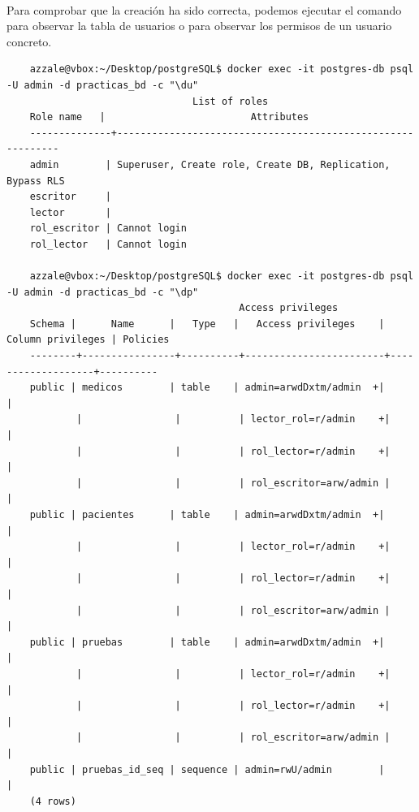 \documentclass{article}
\begin{document}
\\
Para comprobar que la creación ha sido correcta, podemos ejecutar el comando \textit{\du} para observar la tabla de usuarios o \textit{\dp} para observar los permisos de un usuario concreto.
\begin{tcolorbox}[colback=black, coltext=white, fontupper=\ttfamily, title=Terminal]
\begin{verbatim}
    azzale@vbox:~/Desktop/postgreSQL$ docker exec -it postgres-db psql -U admin -d practicas_bd -c "\du"
                                List of roles
    Role name   |                         Attributes                         
    --------------+------------------------------------------------------------
    admin        | Superuser, Create role, Create DB, Replication, Bypass RLS
    escritor     | 
    lector       | 
    rol_escritor | Cannot login
    rol_lector   | Cannot login

    azzale@vbox:~/Desktop/postgreSQL$ docker exec -it postgres-db psql -U admin -d practicas_bd -c "\dp"
                                        Access privileges
    Schema |      Name      |   Type   |   Access privileges    | Column privileges | Policies 
    --------+----------------+----------+------------------------+-------------------+----------
    public | medicos        | table    | admin=arwdDxtm/admin  +|                   | 
            |                |          | lector_rol=r/admin    +|                   | 
            |                |          | rol_lector=r/admin    +|                   | 
            |                |          | rol_escritor=arw/admin |                   | 
    public | pacientes      | table    | admin=arwdDxtm/admin  +|                   | 
            |                |          | lector_rol=r/admin    +|                   | 
            |                |          | rol_lector=r/admin    +|                   | 
            |                |          | rol_escritor=arw/admin |                   | 
    public | pruebas        | table    | admin=arwdDxtm/admin  +|                   | 
            |                |          | lector_rol=r/admin    +|                   | 
            |                |          | rol_lector=r/admin    +|                   | 
            |                |          | rol_escritor=arw/admin |                   | 
    public | pruebas_id_seq | sequence | admin=rwU/admin        |                   | 
    (4 rows)
\end{verbatim}
\end{tcolorbox}
\\
\end{document}
